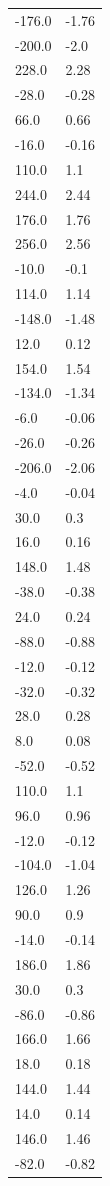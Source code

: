 \begin{longtable}{ll}
-176.0 & -1.76 \\
-200.0 & -2.0 \\
228.0 & 2.28 \\
-28.0 & -0.28 \\
66.0 & 0.66 \\
-16.0 & -0.16 \\
110.0 & 1.1 \\
244.0 & 2.44 \\
176.0 & 1.76 \\
256.0 & 2.56 \\
-10.0 & -0.1 \\
114.0 & 1.14 \\
-148.0 & -1.48 \\
12.0 & 0.12 \\
154.0 & 1.54 \\
-134.0 & -1.34 \\
-6.0 & -0.06 \\
-26.0 & -0.26 \\
-206.0 & -2.06 \\
-4.0 & -0.04 \\
30.0 & 0.3 \\
16.0 & 0.16 \\
148.0 & 1.48 \\
-38.0 & -0.38 \\
24.0 & 0.24 \\
-88.0 & -0.88 \\
-12.0 & -0.12 \\
-32.0 & -0.32 \\
28.0 & 0.28 \\
8.0 & 0.08 \\
-52.0 & -0.52 \\
110.0 & 1.1 \\
96.0 & 0.96 \\
-12.0 & -0.12 \\
-104.0 & -1.04 \\
126.0 & 1.26 \\
90.0 & 0.9 \\
-14.0 & -0.14 \\
186.0 & 1.86 \\
30.0 & 0.3 \\
-86.0 & -0.86 \\
166.0 & 1.66 \\
18.0 & 0.18 \\
144.0 & 1.44 \\
14.0 & 0.14 \\
146.0 & 1.46 \\
-82.0 & -0.82 \\

\end{longtable}
